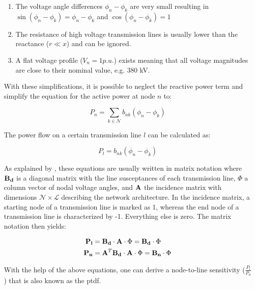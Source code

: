 \begin{enumerate}
	\item The voltage angle differences $\phi_n-\phi_k$ are very small resulting in $\sin{(\phi_n-\phi_k)} = \phi_n-\phi_k$ and $\cos{(\phi_n-\phi_k)} = 1$
	\item The resistance of high voltage transmission lines is usually lower than the reactance ($r \ll x$) and can be ignored.
	\item A flat voltage profile ($V_n = 1 p.u.$) exists meaning that all voltage magnitudes are close to their nominal value, e.g. 380 kV.
\end{enumerate}

With these simplifications, it is possible to neglect the reactive power term and simplify the equation for the active power at node $n$ to:

\begin{equation}
	P_n = \sum_{k \in \mathcal{N}} b_{nk}(\phi_n-\phi_k)
\end{equation}

The power flow on a certain transmission line $l$ can be calculated as:

\begin{equation}
	P_l = b_{nk}(\phi_n-\phi_k)
\end{equation}

As explained by \citet{weinhold2022}, these equations are usually written in matrix notation where $\vb{B_d}$ is a diagonal matrix with the line susceptances of each transmission line, $\Phi$ a column vector of nodal voltage angles, and $\vb{A}$ the incidence matrix with dimensions $\mathcal{N} \times \mathcal{L}$ describing the network architecture. In the incidence matrix, a starting node of a transmission line is marked as 1, whereas the end node of a transmission line is characterized by -1. Everything else is zero. The matrix notation then yields:

\begin{subequations}
	\begin{align}
		\vb{P_l} &= \vb{B_d} \cdot \vb{A} \cdot \Phi = \vb{B_d} \cdot \Phi \\
		\vb{P_n} &= \vb{A}^T \vb{B_d} \cdot \vb{A} \cdot \Phi = \vb{B_n} \cdot \Phi \label{eq:theo:nodal-power:matrix}
	\end{align}
\end{subequations}

With the help of the above equations, one can derive a node-to-line sensitivity ($\frac{P_l}{P_n}$) that is also known as the \gls{ptdf}.


